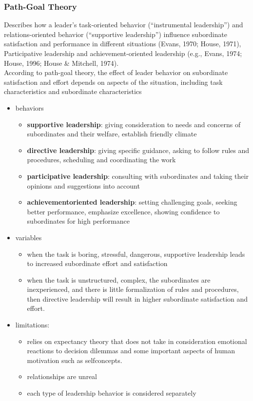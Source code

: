 \subsubsection{Path-Goal Theory} %
\label{ssub:path_goal_theory}
Describes how a leader’s task-oriented behavior (“instrumental leadership”) and relations-oriented behavior (“supportive leadership”) influence
subordinate satisfaction and performance in different situations (Evans, 1970; House, 1971), Participative leadership and achievement-oriented leadership (e.g., Evans, 1974; House, 1996; House \& Mitchell, 1974).
\\According to path-goal theory, the effect of leader behavior on subordinate satisfaction and effort depends on aspects of the situation, including task characteristics and subordinate characteristics

\begin{itemize}
	\item behaviors
	\begin{itemize}
		\item \textbf{supportive leadership}: giving consideration to needs and concerns of subordinates and their welfare, establish friendly climate
		\item \textbf{directive leadership}: giving specific guidance, asking to follow rules and procedures, scheduling and coordinating the work
		\item \textbf{participative leadership}: consulting with subordinates and taking their opinions and suggestions into account
		\item \textbf{achievement­oriented leadership}: setting challenging goals, seeking better performance, emphasize excellence, showing confidence to subordinates for high performance
	\end{itemize}
	\item variables
	\begin{itemize}
		\item when the task is boring, stressful, dangerous, supportive leadership leads to increased subordinate effort and satisfaction
		\item when the task is unstructured, complex, the subordinates are inexperienced, and there is little formalization of rules and procedures, then directive leadership will result in higher subordinate satisfaction and effort.
	\end{itemize}
	\item limitations:
	\begin{itemize}
		\item relies on expectancy theory that does not take in consideration emotional reactions to decision dilemmas and some important aspects of human motivation such as self­concepts.
		\item relationships are unreal
		\item each type of leadership behavior is considered separately
	\end{itemize}
\end{itemize}


